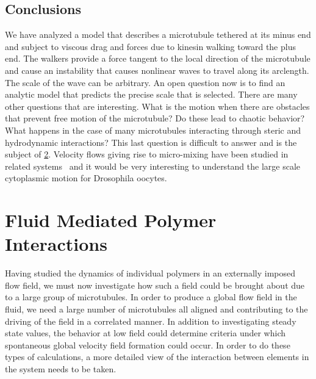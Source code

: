 \documentclass[11pt]{ucthesis}
\begin{document}
\section{Conclusions}

We have analyzed a model that describes a microtubule tethered at its minus
end and subject to viscous drag and forces due to kinesin walking toward the plus end. The walkers
provide a force tangent to the local direction of the microtubule and
cause an instability that causes nonlinear waves to travel along its
arclength. The scale of the wave can be arbitrary. An open question now 
is to find an analytic model that predicts the precise scale that
is selected. There are many other questions that are interesting.
What is the motion when there are obstacles that prevent free motion
of the microtubule? Do these lead to chaotic behavior? What happens
in the case of many microtubules interacting through steric and hydrodynamic
interactions? This last question is difficult to answer and is the subject of \ref{chap:Interact}. Velocity
flows giving rise to micro-mixing have been studied in related systems~\cite{GoldsteinTuvalvandeMeentPNAS,GoldsteinTuvalvandeMeentPRL,MeentSedermanGladdenGoldstein,VerchotLubiczGoldstein} and it would be very interesting to
understand the large scale cytoplasmic motion for Drosophila oocytes.







\chapter{Fluid Mediated Polymer Interactions}
\label{chap:Interact}
Having studied the dynamics of individual polymers in an externally imposed flow field, we must now investigate how such a field could be brought about due to a large group of microtubules. 
In order to produce a global flow field in the fluid, we need a large number of microtubules all aligned and contributing to the driving of the field in a correlated manner. 
In addition to investigating steady state values, the behavior at low field could determine criteria under which spontaneous global velocity field formation could occur. In order to do these types of calculations, a more detailed view of the interaction between elements in the system needs to be taken.
\end{document}

